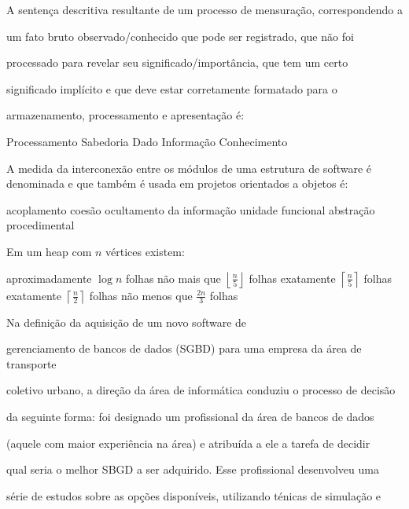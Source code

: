 \documentclass[12pt, addpoints]{exam}
\begin{document}
\begin{questions}
\question

A sentença descritiva resultante de um processo de mensuração, correspondendo a

um fato bruto observado/conhecido que pode ser registrado, que não foi

processado para revelar seu significado/importância, que tem um certo

significado implícito e que deve estar corretamente formatado para o

armazenamento, processamento e apresentação é:
\begin{choices}
\choice Processamento
\choice Sabedoria
\choice Dado
\choice Informação
\choice Conhecimento
\end{choices}

\question

A medida da interconexão entre os módulos de uma estrutura de software é denominada e que também é usada em projetos orientados a objetos é: 
\begin{choices}
\choice acoplamento
\choice coesão
\choice ocultamento da informação
\choice unidade funcional
\choice abstração procedimental
\end{choices}

\question

Em um heap com \( n \) vértices existem:
\begin{choices}
\choice aproximadamente \( \log n \) folhas
\choice não mais que \( \left\lfloor \frac{n}{5} \right\rfloor \) folhas
\choice exatamente \( \left\lceil \frac{n}{5} \right\rceil \) folhas
\choice exatamente \( \left\lceil \frac{n}{2} \right\rceil \) folhas
\choice não menos que \( \frac{2n}{3} \) folhas
\end{choices}

\question

Na definição da aquisição de um novo software de

gerenciamento de bancos de dados (SGBD) para uma empresa da área de transporte 

coletivo urbano, a direção da área de informática conduziu o processo de decisão

da seguinte forma: foi designado um profissional da área de bancos de dados

(aquele com maior experiência na área) e atribuída a ele a tarefa de decidir

qual seria o melhor SBGD a ser adquirido. Esse profissional desenvolveu uma

série de estudos sobre as opções disponíveis, utilizando ténicas de simulação e


\end{questions}
\end{document}
